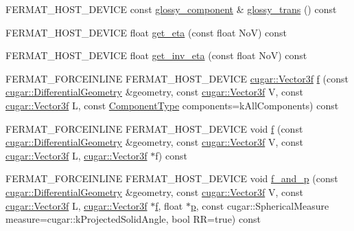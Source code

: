 \begin{DoxyCompactItemize}
\item 
F\+E\+R\+M\+A\+T\+\_\+\+H\+O\+S\+T\+\_\+\+D\+E\+V\+I\+CE const \hyperlink{structcugar_1_1_g_g_x_smith_bsdf}{glossy\+\_\+component} \& \hyperlink{struct_bsdf_a40f0038a911021c5f3748ce8f51ac14c}{glossy\+\_\+trans} () const
\item 
F\+E\+R\+M\+A\+T\+\_\+\+H\+O\+S\+T\+\_\+\+D\+E\+V\+I\+CE float \hyperlink{struct_bsdf_ac8350cc0e45d5cc5e1eb4720200eb472}{get\+\_\+eta} (const float NoV) const
\item 
F\+E\+R\+M\+A\+T\+\_\+\+H\+O\+S\+T\+\_\+\+D\+E\+V\+I\+CE float \hyperlink{struct_bsdf_a7b87e71a26d0a87080be653929e52cd5}{get\+\_\+inv\+\_\+eta} (const float NoV) const
\item 
F\+E\+R\+M\+A\+T\+\_\+\+F\+O\+R\+C\+E\+I\+N\+L\+I\+NE F\+E\+R\+M\+A\+T\+\_\+\+H\+O\+S\+T\+\_\+\+D\+E\+V\+I\+CE \hyperlink{structcugar_1_1_vector}{cugar\+::\+Vector3f} \hyperlink{struct_bsdf_a58f402b71508cb422ebe3f0e628fd2fd}{f} (const \hyperlink{structcugar_1_1_differential_geometry}{cugar\+::\+Differential\+Geometry} \&geometry, const \hyperlink{structcugar_1_1_vector}{cugar\+::\+Vector3f} V, const \hyperlink{structcugar_1_1_vector}{cugar\+::\+Vector3f} L, const \hyperlink{struct_bsdf_a5f7db6f81220ed9ee6da109d6eb5b585}{Component\+Type} components=k\+All\+Components) const
\item 
F\+E\+R\+M\+A\+T\+\_\+\+F\+O\+R\+C\+E\+I\+N\+L\+I\+NE F\+E\+R\+M\+A\+T\+\_\+\+H\+O\+S\+T\+\_\+\+D\+E\+V\+I\+CE void \hyperlink{struct_bsdf_a6b91ccd2463e6461f2c758be5b1e35b8}{f} (const \hyperlink{structcugar_1_1_differential_geometry}{cugar\+::\+Differential\+Geometry} \&geometry, const \hyperlink{structcugar_1_1_vector}{cugar\+::\+Vector3f} V, const \hyperlink{structcugar_1_1_vector}{cugar\+::\+Vector3f} L, \hyperlink{structcugar_1_1_vector}{cugar\+::\+Vector3f} $\ast$f) const
\item 
F\+E\+R\+M\+A\+T\+\_\+\+F\+O\+R\+C\+E\+I\+N\+L\+I\+NE F\+E\+R\+M\+A\+T\+\_\+\+H\+O\+S\+T\+\_\+\+D\+E\+V\+I\+CE void \hyperlink{struct_bsdf_af1ad14ad4a31c7604581a551c3fb1901}{f\+\_\+and\+\_\+p} (const \hyperlink{structcugar_1_1_differential_geometry}{cugar\+::\+Differential\+Geometry} \&geometry, const \hyperlink{structcugar_1_1_vector}{cugar\+::\+Vector3f} V, const \hyperlink{structcugar_1_1_vector}{cugar\+::\+Vector3f} L, \hyperlink{structcugar_1_1_vector}{cugar\+::\+Vector3f} $\ast$\hyperlink{struct_bsdf_a58f402b71508cb422ebe3f0e628fd2fd}{f}, float $\ast$\hyperlink{struct_bsdf_a88c3b1f89a3248d4b2684fd402a59ced}{p}, const cugar\+::\+Spherical\+Measure measure=cugar\+::k\+Projected\+Solid\+Angle, bool RR=true) const

\end{DoxyCompactItemize}
